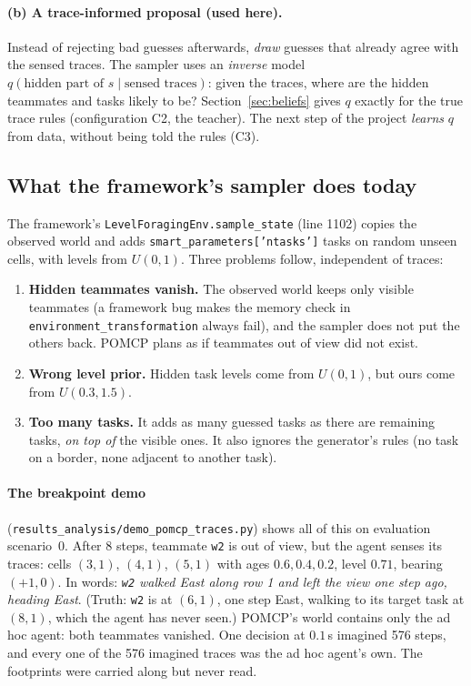 \documentclass[11pt,a4paper]{article}
\newcommand{\file}{\nolinkurl}  %
\newcommand{\code}[1]{\texttt{#1}}
\theoremstyle{remark}
\begin{document}
\paragraph{(b) A trace-informed proposal (used here).} Instead of rejecting bad guesses afterwards, \emph{draw} guesses
that already agree with the sensed traces. The sampler uses an \emph{inverse} model $q(\text{hidden part of } s \mid
\text{sensed traces})$: given the traces, where are the hidden teammates and tasks likely to be? Section~\ref{sec:beliefs}
gives $q$ exactly for the true trace rules (configuration C2, the teacher). The next step of the project \emph{learns} $q$
from data, without being told the rules (C3).

\subsection{What the framework's sampler does today}
\label{sec:framework-belief}

The framework's \code{LevelForagingEnv.sample\_state} (line 1102) copies the observed world and adds
\code{smart\_parameters['ntasks']} tasks on random unseen cells, with levels from $U(0,1)$. Three problems follow,
independent of traces:
\begin{enumerate}[nosep]
  \item \textbf{Hidden teammates vanish.} The observed world keeps only visible teammates (a framework bug makes the memory check in
        \code{environment\_transformation} always fail), and the sampler does not
        put the others back. POMCP plans as if teammates out of view did not exist.
  \item \textbf{Wrong level prior.} Hidden task levels come from $U(0,1)$, but ours come from $U(0.3,1.5)$.
  \item \textbf{Too many tasks.} It adds as many guessed tasks as there are remaining tasks, \emph{on top of} the visible
        ones. It also ignores the generator's rules (no task on a border, none adjacent to another task).
\end{enumerate}

\paragraph{The breakpoint demo} (\file{results_analysis/demo_pomcp_traces.py}) shows all of this on evaluation
scenario~0. After 8 steps, teammate \code{w2} is out of view, but the agent senses its traces: cells $(3,1)$, $(4,1)$,
$(5,1)$ with ages $0.6, 0.4, 0.2$, level $0.71$, bearing $(+1,0)$. In words: \emph{\code{w2} walked East along row 1 and
left the view one step ago, heading East}. (Truth: \code{w2} is at $(6,1)$, one step East, walking to its target task at $(8,1)$, which the agent has never seen.) POMCP's world contains only the ad hoc agent: both teammates vanished. One
decision at $0.1$\,s imagined 576 steps, and every one of the 576 imagined traces was the ad hoc agent's own. The
footprints were carried along but never read.
\end{document}
